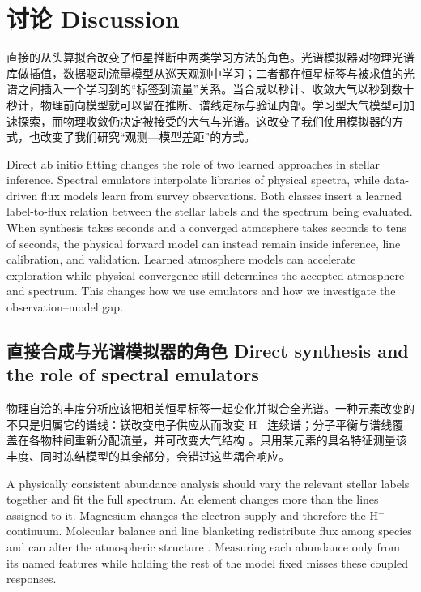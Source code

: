 \section{讨论 Discussion}\label{sec:discussion}

直接的从头算拟合改变了恒星推断中两类学习方法的角色。光谱模拟器对物理光谱库做插值，数据驱动流量模型从巡天观测中学习；二者都在恒星标签与被求值的光谱之间插入一个学习到的“标签到流量”关系。当合成以秒计、收敛大气以秒到数十秒计，物理前向模型就可以留在推断、谱线定标与验证内部。学习型大气模型可加速探索，而物理收敛仍决定被接受的大气与光谱。这改变了我们使用模拟器的方式，也改变了我们研究“观测—模型差距”的方式。

\begin{EN}
Direct ab initio fitting changes the role of two learned approaches in stellar
inference. Spectral emulators interpolate libraries of
physical spectra, while data-driven flux models learn from survey observations.
Both classes insert a learned label-to-flux relation between the stellar labels and the
spectrum being evaluated. When synthesis takes seconds and a converged
atmosphere takes seconds to tens of seconds, the physical forward model can
instead remain inside inference, line calibration, and validation. Learned
atmosphere models can accelerate exploration while physical convergence still
determines the accepted atmosphere and spectrum. This changes how we use
emulators and how we investigate the observation--model gap.
\end{EN}

\subsection{直接合成与光谱模拟器的角色 Direct synthesis and the role of spectral emulators}\label{sec:discussion_emulators}

物理自洽的丰度分析应该把相关恒星标签一起变化并拟合全光谱。一种元素改变的不只是归属它的谱线：镁改变电子供应从而改变 H$^-$ 连续谱；分子平衡与谱线覆盖在各物种间重新分配流量，并可改变大气结构 \citep{John1988,Gustafsson2008,Meszaros2012,Ting2018Oxygen,Matsuno2024}。只用某元素的具名特征测量该丰度、同时冻结模型的其余部分，会错过这些耦合响应。

\begin{EN}
A physically consistent abundance analysis should vary the relevant stellar
labels together and fit the full spectrum. An element changes more than the
lines assigned to it. Magnesium changes the electron supply and therefore the
H$^-$ continuum. Molecular balance and line blanketing redistribute flux among
species and can alter the atmospheric structure
\citep{John1988,Gustafsson2008,Meszaros2012,Ting2018Oxygen,Matsuno2024}.
Measuring each abundance only from its named features while holding the rest of
the model fixed misses these coupled responses.
\end{EN}


